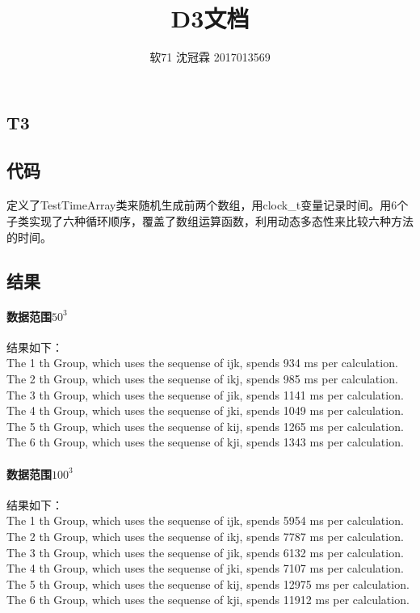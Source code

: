 \documentclass{article}
\title{D3文档}
\author{软71 沈冠霖 2017013569}
\begin{document}
\begin{CJK}{UTF8}{gkai}
\maketitle
\section{T3} 
\subsection{代码} 
\paragraph{}定义了TestTimeArray类来随机生成前两个数组，用clock\_t变量记录时间。用6个子类实现了六种循环顺序，覆盖了数组运算函数，利用动态多态性来比较六种方法的时间。
\subsection{结果}
\paragraph{数据范围$50^{3}$}结果如下：\\
The 1 th Group, which uses the sequense of ijk, spends 934 ms per calculation.\\
The 2 th Group, which uses the sequense of ikj, spends 985 ms per calculation.\\
The 3 th Group, which uses the sequense of jik, spends 1141 ms per calculation.\\
The 4 th Group, which uses the sequense of jki, spends 1049 ms per calculation.\\
The 5 th Group, which uses the sequense of kij, spends 1265 ms per calculation.\\
The 6 th Group, which uses the sequense of kji, spends 1343 ms per calculation.\\
\paragraph{数据范围$100^{3}$}结果如下：\\
The 1 th Group, which uses the sequense of ijk, spends 5954 ms per calculation.\\
The 2 th Group, which uses the sequense of ikj, spends 7787 ms per calculation.\\
The 3 th Group, which uses the sequense of jik, spends 6132 ms per calculation.\\
The 4 th Group, which uses the sequense of jki, spends 7107 ms per calculation.\\
The 5 th Group, which uses the sequense of kij, spends 12975 ms per calculation.\\
The 6 th Group, which uses the sequense of kji, spends 11912 ms per calculation.\\

\end{CJK}
\end{document}
